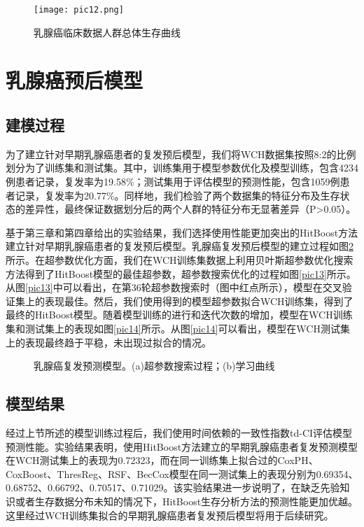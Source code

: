 \begin{figure}[H]
\texttt{[image: pic12.png]}
\caption{乳腺癌临床数据人群总体生存曲线}
\label{pic12}
\end{figure}

\section{乳腺癌预后模型}

\subsection{建模过程}
为了建立针对早期乳腺癌患者的复发预后模型，我们将WCH数据集按照8:2的比例划分为了训练集和测试集。其中，训练集用于模型参数优化及模型训练，包含4234例患者记录，复发率为19.58\%；测试集用于评估模型的预测性能，包含1059例患者记录，复发率为20.77\%。同样地，我们检验了两个数据集的特征分布及生存状态的差异性，最终保证数据划分后的两个人群的特征分布无显著差异（P>0.05）。

基于第三章和第四章给出的实验结果，我们选择使用性能更加突出的HitBoost方法建立针对早期乳腺癌患者的复发预后模型。乳腺癌复发预后模型的建立过程如图\ref{pic1314}所示。在超参数优化方面，我们在WCH训练集数据上利用贝叶斯超参数优化搜索方法得到了HitBoost模型的最佳超参数，超参数搜索优化的过程如图\ref{pic13}所示。从图\ref{pic13}中可以看出，在第36轮超参数搜索时（图中红点所示），模型在交叉验证集上的表现最佳。然后，我们使用得到的模型超参数拟合WCH训练集，得到了最终的HitBoost模型。随着模型训练的进行和迭代次数的增加，模型在WCH训练集和测试集上的表现如图\ref{pic14}所示。从图\ref{pic14}可以看出，模型在WCH测试集上的表现最终趋于平稳，未出现过拟合的情况。

\begin{figure}[H]
\centering 
{}
\hspace{0.01\linewidth}
\caption{乳腺癌复发预测模型。(a)超参数搜索过程；(b)学习曲线}
\label{pic1314}
\end{figure}

\subsection{模型结果}

经过上节所述的模型训练过程后，我们使用时间依赖的一致性指数td-CI评估模型预测性能。实验结果表明，使用HitBoost方法建立的早期乳腺癌患者复发预测模型在WCH测试集上的表现为0.72323，而在同一训练集上拟合过的CoxPH、CoxBoost、ThresReg、RSF、BecCox模型在同一测试集上的表现分别为0.69354、0.68752、0.66792、0.70517、0.71029。该实验结果进一步说明了，在缺乏先验知识或者生存数据分布未知的情况下，HitBoost生存分析方法的预测性能更加优越。这里经过WCH训练集拟合的早期乳腺癌患者复发预后模型将用于后续研究。

